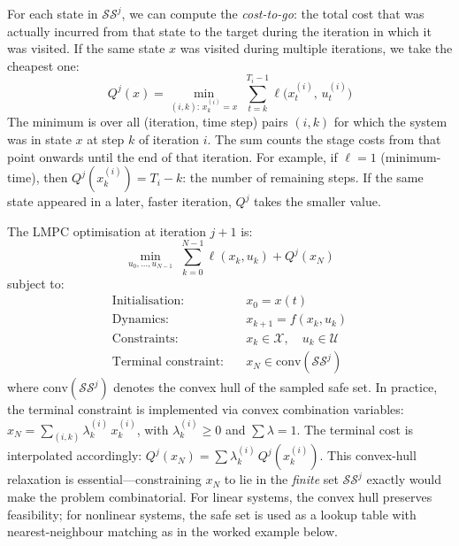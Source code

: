 For each state in $\mathcal{SS}^j$, we can compute the \emph{cost-to-go}: the total cost that was actually incurred from that state to the target during the iteration in which it was visited. If the same state $x$ was visited during multiple iterations, we take the cheapest one:
\begin{equation}\label{eq:cost_to_go}
	Q^j(x) = \min_{(i,k):\, x_k^{(i)} = x}\; \sum_{t=k}^{T_i-1} \ell\bigl(x_t^{(i)},\, u_t^{(i)}\bigr)
\end{equation}
The minimum is over all (iteration, time step) pairs $(i,k)$ for which the system was in state $x$ at step $k$ of iteration $i$. The sum counts the stage costs from that point onwards until the end of that iteration. For example, if $\ell = 1$ (minimum-time), then $Q^j(x_k^{(i)}) = T_i - k$: the number of remaining steps. If the same state appeared in a later, faster iteration, $Q^j$ takes the smaller value.

The LMPC optimisation at iteration $j+1$ is:
\begin{equation}\label{eq:lmpc_opt}
	\min_{u_0, \ldots, u_{N-1}}\; \sum_{k=0}^{N-1}\ell(x_k, u_k) + Q^j(x_N)
\end{equation}
subject to:
\begin{align*}
	\text{Initialisation:} \quad & x_0 = x(t) \\
	\text{Dynamics:} \quad & x_{k+1} = f(x_k, u_k) \\
	\text{Constraints:} \quad & x_k \in \mathcal{X}, \quad u_k \in \mathcal{U} \\
	\text{Terminal constraint:} \quad & x_N \in \text{conv}(\mathcal{SS}^j)
\end{align*}
where $\text{conv}(\mathcal{SS}^j)$ denotes the convex hull of the sampled safe set. In practice, the terminal constraint is implemented via convex combination variables: $x_N = \sum_{(i,k)} \lambda_k^{(i)}\,x_k^{(i)}$, with $\lambda_k^{(i)} \ge 0$ and $\sum \lambda = 1$. The terminal cost is interpolated accordingly: $Q^j(x_N) = \sum \lambda_k^{(i)}\,Q^j(x_k^{(i)})$. This convex-hull relaxation is essential---constraining $x_N$ to lie in the \emph{finite} set $\mathcal{SS}^j$ exactly would make the problem combinatorial. For linear systems, the convex hull preserves feasibility; for nonlinear systems, the safe set is used as a lookup table with nearest-neighbour matching as in the worked example below.

